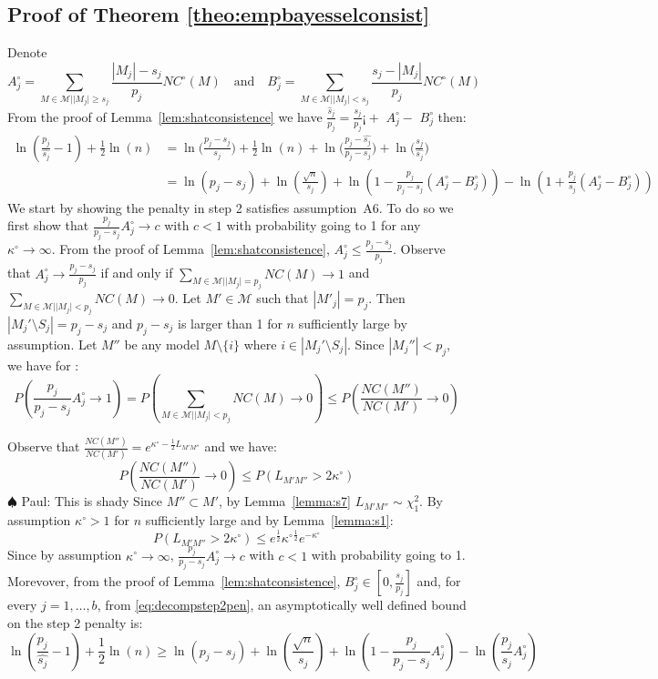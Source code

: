 \documentclass[aos]{imsart}
\theoremstyle{plain}
\newcommand{\paul}[1]{{\small{\color{green} \sf $\spadesuit$ Paul: #1}}}
\begin{document}
\begin{supplement}
\subsection{Proof of Theorem \ref{theo:empbayesselconsist}}

Denote 
\begin{equation}
    A^{\circ}_j = \sum_{M \in \mathcal{M} | |M_j| \geq s_j}\frac{|M_j|-s_j}{p_j}NC^{\circ}(M)\quad\text{and}\quad
    B^{\circ}_j = \sum_{M \in \mathcal{M} | |M_j| < s_j}\frac{s_j-|M_j|}{p_j}NC^{\circ}(M)
\end{equation}
From the proof of Lemma~\ref{lem:shatconsistence} we have $ \frac{\widehat{s}_j}{p_j}  = \frac{s_j}{p_j}¡
+\,\, A^{\circ}_j-\,\,B^{\circ}_j  $ then:
\begin{align}\label{eq:decompstep2pen}
    \ln(\frac{p_j}{\hat{s_j}}-1) + \frac{1}{2}\ln(n) 
    &= \ln\Big(\frac{p_j-s_j}{s_j}\Big) + \frac{1}{2}\ln(n) + \ln\Big(\frac{p_j-\hat{s_j}}{p_j-s_j}\Big) + \ln\Big(\frac{s_j}{\hat{s_j}}\Big) \nonumber \\
    &= \ln(p_j-s_j)+\ln(\frac{\sqrt{n}}{s_j})+\ln(1-\frac{p_j}{p_j-s_j}(A^{\circ}_j-B^{\circ}_j))-\ln(1+\frac{p_j}{s_j}(A^{\circ}_j-B^{\circ}_j))
\end{align}
We start by showing the penalty in step 2 satisfies assumption~A6. To do so we first show that $\frac{p_j}{p_j-s_j}A^{\circ}_j\to c$ with $c <1$ with probability going to 1 for any $\kappa^{\circ}\to \infty$. From the proof of Lemma~\ref{lem:shatconsistence}, $A^{\circ}_j\leq \frac{p_j-s_j}{p_j}$. Observe that $A^{\circ}_j \to \frac{p_j-s_j}{p_j}$ if and only if $\sum_{M\in \mathcal{M}||M_j|=p_j}NC(M)\to 1$ and $\sum_{M\in \mathcal{M}||M_j|<p_j}NC(M)\to 0$. Let $M'\in \mathcal{M}$ such that $|M'_j|=p_j$. Then $|M_j'\setminus S_j|= p_j-s_j$ and $p_j-s_j$ is larger than 1 for $n$ sufficiently large by assumption. Let $M''$ be any model $M \setminus\{i\}$ where $i\in |M_j'\setminus S_j|$. Since $|M_j''|<p_j$, we have for :
$$P(\frac{p_j}{p_j-s_j}A^{\circ}_j  \to 1) =P( \sum_{M\in \mathcal{M}||M_j|<p_j}NC(M) \to 0)\leq P(\frac{NC(M'')}{NC(M')} \to 0)$$

Observe that
$\frac{NC(M'')}{NC(M')}=e^{\kappa^{\circ}-\frac{1}{2}L_{M'M''}}$ and we have:
$$P(\frac{NC(M'')}{NC(M')} \to 0)\leq P(L_{M'M''}>2\kappa^{\circ})$$\paul{This is shady}
Since $M''\subset M'$, by Lemma~\ref{lemma:s7} $L_{M'M''}\sim \chi_{1}^2$. By assumption $\kappa^{\circ} >1$ for $n$ sufficiently large and by Lemma~\ref{lemma:s1}:
$$P(L_{M'M''}>2\kappa^{\circ}) \leq e^{\frac{1}{2}}{\kappa^{\circ}}^{\frac{1}{2}}e^{-\kappa^{\circ}}$$
Since by assumption $\kappa^{\circ} \to \infty$, $\frac{p_j}{p_j-s_j}A^{\circ}_j\to c$ with $c <1$ with probability going to 1. Morevover, from the proof of Lemma~\ref{lem:shatconsistence}, $B^{\circ}_j \in [0,\frac{s_j}{p_j}]$ and, for every $j=1,\ldots,b$, from \eqref{eq:decompstep2pen}, an asymptotically well defined bound on the step 2 penalty is:
\begin{equation*}
  \ln(\frac{p_j}{\hat{s_j}}-1) + \frac{1}{2}\ln(n) \geq \ln(p_j-s_j)+\ln(\frac{\sqrt{n}}{s_j})+\ln(1-\frac{p_j}{p_j-s_j}A^{\circ}_j)-\ln(\frac{p_j}{s_j}A^{\circ}_j)  
\end{equation*}


\end{supplement}
\end{document}
